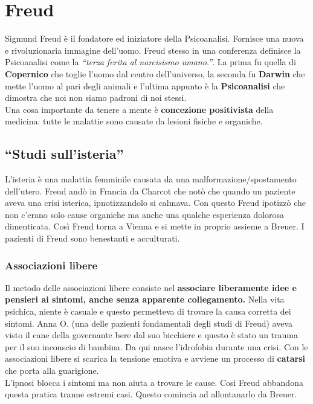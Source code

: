 
\section{Freud}
Sigmund Freud è il fondatore ed iniziatore della Psicoanalisi. Fornisce una nuova e rivoluzionaria
immagine dell'uomo. Freud stesso in una conferenza definisce la Psicoanalisi come la \textit{``terza
ferita al narcisismo umano.''}. La prima fu quella di \textbf{Copernico} che toglie l'uomo dal centro
dell'universo, la seconda fu \textbf{Darwin} che mette l'uomo al pari degli animali e l'ultima
appunto è la \textbf{Psicoanalisi} che dimostra che noi non siamo padroni di noi stessi.\\
Una cosa importante da tenere a mente è \textbf{concezione positivista} della medicina: tutte le
malattie sono causate da lesioni fisiche e organiche.

\subsection{``Studi sull'isteria''}
L'isteria è una malattia femminile causata da una malformazione/spostamento dell'utero. Freud andò in
Francia da Charcot che notò che quando un paziente aveva una crisi isterica, ipnotizzandolo si 
calmava. Con questo Freud ipotizzò che non c'erano solo cause organiche ma anche una qualche 
esperienza dolorosa dimenticata. Così Freud torna a Vienna e si mette in proprio assieme a Breuer.
I pazienti di Freud sono benestanti e acculturati.

\subsubsection{Associazioni libere}
Il metodo delle associazioni libere consiste nel \textbf{associare liberamente idee e pensieri ai
sintomi, anche senza apparente collegamento.} Nella vita psichica, niente è casuale e questo 
permetteva di trovare la causa corretta dei sintomi. Anna O. (una delle pazienti fondamentali degli
studi di Freud) aveva visto il cane della governante bere dal suo bicchiere e questo è stato
un trauma per il suo inconscio di bambina. Da qui nasce l'idrofobia durante una crisi. Con le 
associazioni libere si scarica la tensione emotiva e avviene un processo di \textbf{catarsi} che 
porta alla guarigione.\\
L'ipnosi blocca i sintomi ma non aiuta a trovare le cause. Così Freud abbandona questa pratica tranne
estremi casi. Questo comincia ad allontanarlo da Breuer.

